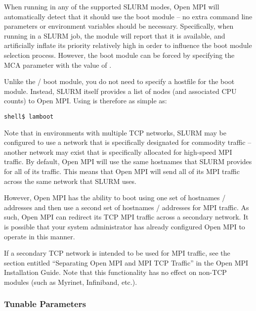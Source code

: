 When running in any of the supported SLURM modes, Open MPI will
automatically detect that it should use the  boot module
-- no extra command line parameters or environment variables should be
necessary.
%
Specifically, when running in a SLURM job, the  module
will report that it is available, and artificially inflate its
priority relatively high in order to influence the boot module
selection process.
%
However, the  boot module can be forced by specifying the
 MCA parameter with the value of
.

Unlike the / boot module, you do not need to specify
a hostfile for the  boot module.  Instead, SLURM itself
provides a list of nodes (and associated CPU counts) to Open MPI.  Using
 is therefore as simple as:

\lstset{style=lam-cmdline}
\begin{lstlisting}
shell$ lamboot
\end{lstlisting}


Note that in environments with multiple TCP networks, SLURM may be
configured to use a network that is specifically designated for
commodity traffic -- another network may exist that is specifically
allocated for high-speed MPI traffic.  By default, Open MPI will use the
same hostnames that SLURM provides for all of its traffic.  This means
that Open MPI will send all of its MPI traffic across the same network that
SLURM uses.

However, Open MPI has the ability to boot using one set of hostnames /
addresses and then use a second set of hostnames / addresses for MPI
traffic.  As such, Open MPI can redirect its TCP MPI traffic across a
secondary network.  It is possible that your system administrator has
already configured Open MPI to operate in this manner.

If a secondary TCP network is intended to be used for MPI traffic, see
the section entitled ``Separating Open MPI and MPI TCP Traffic'' in the
Open MPI Installation Guide.  Note that this functionality has no
effect on non-TCP  modules (such as Myrinet, Infiniband,
etc.).



\subsubsection{Tunable Parameters}

